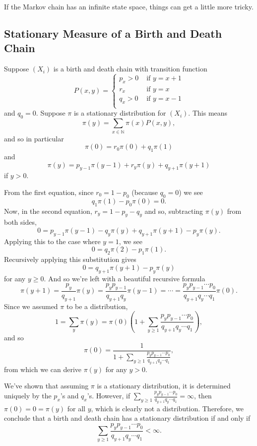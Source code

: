 \documentclass{problemset}
\newcommand{\N}{\mathbb{N}}
\begin{document}
	If the Markov chain has an infinite state space, things can get a little more tricky.

	\subsection*{Stationary Measure of a Birth and Death Chain}

	Suppose $(X_i)$ is a birth and death chain with transition function
	\[
		P(x,y)=\begin{cases} 
			p_x>0 &\text{ if }y=x+1\\
			r_x &\text{ if }y=x\\
			q_x>0 &\text{ if }y=x-1\\
		\end{cases}
	\]
	and $q_0=0$.  Suppose $\pi$ is a stationary distribution for $(X_i)$.  This means
	\[
		\pi(y) = \sum_{x\in\N} \pi(x)P(x,y),
	\]
	and so in particular
	\[
		\pi(0)=r_0\pi(0) + q_1\pi(1)
	\]
	and 
	\[
		\pi(y) = p_{y-1}\pi(y-1)+r_y\pi(y)+q_{y+1}\pi(y+1)
	\]
	if $y>0$.

	From the first equation, since $r_0=1-p_0$ (because $q_0=0$) we see
	\[
		q_1\pi(1)-p_0\pi(0)=0.
	\]
	Now, in the second equation, $r_y=1-p_y-q_y$ and so, subtracting $\pi(y)$ from both
	sides,
	\[
		0=p_{y-1}\pi(y-1) - q_y\pi(y) + q_{y+1}\pi(y+1)-p_y\pi(y).
	\]
	Applying this to the case where $y=1$, we see
	\[
		0=q_2\pi(2)-p_1\pi(1).
	\]
	Recursively applying this substitution gives
	\[
		0=q_{y+1}\pi(y+1)-p_y\pi(y)
	\]
	for any $y\geq 0$.  And so we're left with a beautiful recursive formula
	\[
		\pi(y+1) = \frac{p_y}{q_{y+1}}\pi(y) = \frac{p_yp_{y-1}}{q_{y+1}q_{y}}\pi(y-1)=\cdots
		=\frac{p_yp_{y-1}\cdots p_0}{q_{y+1}q_{y}\cdots q_1}\pi(0).
	\]
	Since we assumed $\pi$ to be a distribution, 
	\[
		1=\sum_y \pi(y) = \pi(0)\left(1+\sum_{y\geq 1} \frac{p_yp_{y-1}\cdots p_0}{q_{y+1}q_{y}\cdots q_1}\right),
	\]
	and so
	\[
		\pi(0) = \frac{1}{1+\sum_{y\geq 1} \frac{p_yp_{y-1}\cdots p_0}{q_{y+1}q_{y}\cdots q_1}},
	\]
	from which we can derive $\pi(y)$ for any $y>0$.

	We've shown that assuming $\pi$ is a stationary distribution, it is determined uniquely
	by the $p_x$'s and $q_x$'s.  However, if $\sum_{y\geq 1} \frac{p_yp_{y-1}\cdots p_0}{q_{y+1}q_{y}\cdots q_1}=\infty$,
	then $\pi(0)=0=\pi(y)$ for all $y$, which is clearly not a distribution.
	Therefore, we conclude that a birth and death chain has a stationary distribution if and only if
	\[
		\sum_{y\geq 1} \frac{p_yp_{y-1}\cdots p_0}{q_{y+1}q_{y}\cdots q_1} < \infty.
	\]
	
\end{document}

